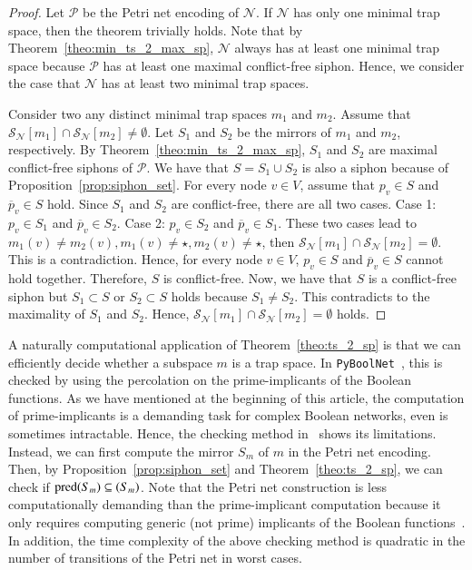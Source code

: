\documentclass[preprint,12pt]{elsarticle}
\DeclareMathOperator{\pred}{pred}
\let\succ\relax
\DeclareMathOperator{\succ}{succ}
\begin{document}
\begin{proof}

  Let \(\mathcal{P}\) be the Petri net encoding of \(\mathcal{N}\).
  If \(\mathcal{N}\) has only one minimal trap space, then the theorem trivially holds.
  Note that by Theorem~\ref{theo:min_ts_2_max_sp}, \(\mathcal{N}\) always has at least one minimal trap space because \(\mathcal{P}\) has at least one maximal conflict-free siphon.
  Hence, we consider the case that \(\mathcal{N}\) has at least two minimal trap spaces.

  Consider two any distinct minimal trap spaces \(m_1\) and \(m_2\).
  Assume that \(\mathcal{S}_{\mathcal{N}}[m_1] \cap \mathcal{S}_{\mathcal{N}}[m_2] \neq \emptyset\).
  Let \(S_1\) and \(S_2\) be the mirrors of \(m_1\) and \(m_2\), respectively.
  By Theorem~\ref{theo:min_ts_2_max_sp}, \(S_1\) and \(S_2\) are maximal conflict-free siphons of \(\mathcal{P}\).
  We have that \(S = S_1 \cup S_2\) is also a siphon because of Proposition~\ref{prop:siphon_set}.
  For every node \(v \in V\), assume that \(p_v \in S\) and \(\overline{p}_v \in S\) hold.
  Since \(S_1\) and \(S_2\) are conflict-free, there are all two cases.
  Case 1: \(p_v \in S_1\) and \(\overline{p}_v \in S_2\).
  Case 2: \(p_v \in S_2\) and \(\overline{p}_v \in S_1\).
  These two cases lead to \(m_1(v) \neq m_2(v), m_1(v) \neq \star, m_2(v) \neq \star\), then  \(\mathcal{S}_{\mathcal{N}}[m_1] \cap \mathcal{S}_{\mathcal{N}}[m_2] = \emptyset\).
  This is a contradiction.
  Hence, for every node \(v \in V\), \(p_v \in S\) and \(\overline{p}_v \in S\) cannot hold together.
  Therefore, \(S\) is conflict-free.
  Now, we have that \(S\) is a conflict-free siphon but \(S_1 \subset S\) or \(S_2 \subset S\) holds because \(S_1 \neq S_2\).
  This contradicts to the maximality of \(S_1\) and \(S_2\).
  Hence, \(\mathcal{S}_{\mathcal{N}}[m_1] \cap \mathcal{S}_{\mathcal{N}}[m_2] = \emptyset\) holds.

\end{proof}

A naturally computational application of Theorem~\ref{theo:ts_2_sp} is that we can efficiently decide whether a subspace \(m\) is a trap space.
In \texttt{PyBoolNet}~\cite{klarner2017pyboolnet}, this is checked by using the percolation on the prime-implicants of the Boolean functions.
As we have mentioned at the beginning of this article, the computation of prime-implicants is a demanding task for complex Boolean networks, even is sometimes intractable.
Hence, the checking method in~\cite{klarner2017pyboolnet} shows its limitations.
Instead, we can first compute the mirror \(S_m\) of \(m\) in the Petri net encoding.
Then, by Proposition~\ref{prop:siphon_set} and Theorem~\ref{theo:ts_2_sp}, we can check if \(\pred(S_m) \subseteq \succ(S_m)\).
Note that the Petri net construction is less computationally demanding than the prime-implicant computation because it only requires computing generic (not prime) implicants of the Boolean functions~\cite{chatain2014characterization}.
In addition, the time complexity of the above checking method is quadratic in the number of transitions of the Petri net in worst cases.
\end{document}
